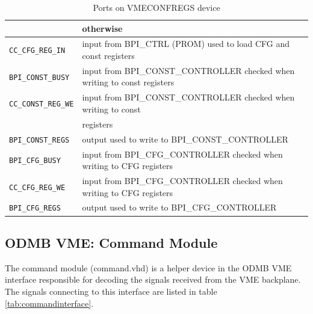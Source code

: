 \documentclass[10pt,a4paper]{article}
\begin{document}
\begin{table}[H]
\begin{tabular}{|l|l|}
                           & otherwise\\ \hline
\texttt{CC\_CFG\_REG\_IN}& input from BPI\_CTRL (PROM) used to load CFG and const registers\\ \hline
\texttt{BPI\_CONST\_BUSY}& input from BPI\_CONST\_CONTROLLER checked when writing to const registers\\ \hline
\texttt{CC\_CONST\_REG\_WE}& input from BPI\_CONST\_CONTROLLER checked when writing to const\\
                           & registers\\ \hline
\texttt{BPI\_CONST\_REGS}& output used to write to BPI\_CONST\_CONTROLLER\\ \hline
\texttt{BPI\_CFG\_BUSY}& input from BPI\_CFG\_CONTROLLER checked when writing to CFG registers\\ \hline
\texttt{CC\_CFG\_REG\_WE}& input from BPI\_CFG\_CONTROLLER checked when writing to CFG registers\\ \hline
\texttt{BPI\_CFG\_REGS}& output used to write to BPI\_CFG\_CONTROLLER\\ \hline
\end{tabular}
\caption{Ports on VMECONFREGS device}
\label{tab:vmeconfregsinterface}
\end{table}


\subsection{ODMB VME: Command Module}

The command module (command.vhd) is a helper device in the ODMB VME interface responsible for decoding the signals received from the VME backplane. The signals connecting to this interface are listed in table \ref{tab:commandinterface}.
\end{document}
